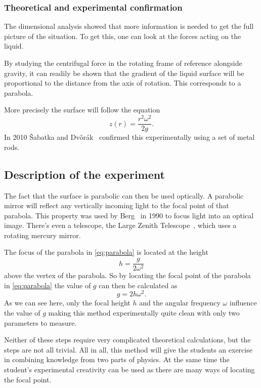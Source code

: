 \documentclass[11pt,
a4paper, 
swedish, english]{article}
\begin{document}
\subsubsection{Theoretical and experimental confirmation}
The dimensional analysis showed that more information is needed to get
the full picture of the situation. To get this, one can look at the
forces acting on the liquid.

By studying the centrifugal force in the rotating frame of reference
alongside gravity, it can readily be shown that the gradient of the
liquid surface will be proportional to the distance from the axis of
rotation. This corresponds to a parabola. 

More precisely the surface will follow the
equation~\cite{Sabatka2010, Berg1990} 
\begin{equation}\label{eq:parabola}
z(r)=\frac{r^2\omega^2}{2g}.
\end{equation}
In 2010 \v{S}abatka and
Dv\v{o}rák~\cite{Sabatka2010} confirmed this experimentally using a
set of metal rods. 


\subsection{Description of the experiment }
The fact that the surface is parabolic can then be used optically. A
parabolic mirror will reflect any vertically incoming light to the
focal point of that parabola. This property was used by
Berg~\cite{Berg1990} in 1990 to focus light into an optical
image. There's even a telescope, the Large Zenith
Telescope~\cite{LargeZenith}, which uses a rotating mercury mirror. 

The focus of the parabola in \eqref{eq:parabola} is located at the
height~\cite{Physics_Handbook} 
\begin{equation}
h=\frac{g}{2\omega^2}
\end{equation}
above the vertex of the parabola. So by locating the focal point of
the parabola in \eqref{eq:parabola} the value of $g$ can then be
calculated as 
\begin{equation}
g=2h\omega^2.
\end{equation}
As we can see here, only the focal height $h$ and the angular
frequency $\omega$ influence the value of $g$ making this method
experimentally quite clean with only two parameters to measure. 

Neither of these steps require very complicated theoretical calculations, but
the steps are not all trivial. All in all, this method will
give the students an exercise in combining knowledge from two parts
of physics. At the same time the student's experimental creativity can
be used as there are many ways of locating the focal point. 
\end{document}
